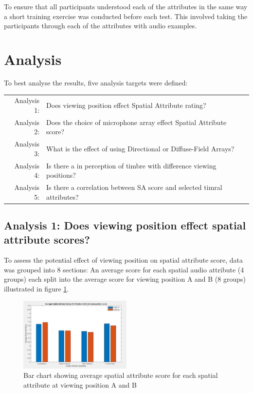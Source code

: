 \documentclass{aes2e}
\begin{document}
		To ensure that all participants understood each of the attributes in the same way a short training exercise was conducted before each test. This involved taking the participants through each of the attributes with audio examples. 


\section{Analysis}
	To best analyse the results, five analysis targets were defined:

	\begin{tabular}{r p{5.5cm}}
		Analysis 1: & Does viewing position effect Spatial Attribute rating? \\
		Analysis 2: & Does the choice of microphone array effect Spatial Attribute score? \\
		Analysis 3: & What is the effect of using Directional or Diffuse-Field Arrays? \\ 
		Analysis 4: & Is there a in perception of timbre with difference viewing positions? \\
		Analysis 5: & Is there a correlation between SA score and selected timral attributes?
	\end{tabular}

	\subsection{Analysis 1: Does viewing position effect spatial attribute scores?}
	\label{ana1}

		To assess the potential effect of viewing position on spatial attribute score, data was grouped into 8 sections: An average score for each spatial audio attribute (4 groups) each split into the average score for viewing position A and B (8 groups) illustrated in figure \ref{image:AvsB}. \\

		\begin{figure}
			\includegraphics[width=0.5\textwidth]{images/plots/AvB_Bar.PNG}
			\caption{Bar chart showing average spatial attribute score for each spatial attribute at viewing position A and B}
			\label{image:AvsB} 
		\end{figure}
\end{document}
